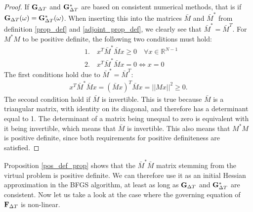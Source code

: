 \begin{proof}
If $\bold G_{\Delta T}$ and $\bold G_{\Delta T}^*$ are based on consistent numerical methods, that is if $\bold G_{\Delta T}(\omega)=\bold G_{\Delta T}^*(\omega)$. When inserting this into the matrices $\bar M$ and $\bar M^*$ from definition \ref{prop_def} and \ref{adjoint_prop_def}, we clearly see that $\bar M^*=\bar M^T$. For $M^*M$ to be positive definite, the following two conditions must hold:
\begin{align*}
&1.\quad x^T\bar M^*\bar Mx \geq 0 \quad \forall x\in\mathbb{R}^{N-1} \\
&2.\quad x^T\bar M^*\bar Mx =0 \iff x=0
\end{align*}
The first conditions hold due to $\bar M^*=\bar M^T$:
\begin{align*}
x^T\bar M^*\bar Mx = (\bar Mx)^T\bar Mx = ||Mx||^2 \geq 0.
\end{align*}
The second condition hold if $\bar M$ is invertible. This is true because $\bar M$ is a triangular matrix, with identity on its diagonal, and therefore has a determinant equal to 1. The determinant of a matrix being unequal to zero is equivalent with it being invertible, which means that $\bar M$ is invertible. This also means that $M^*M$ is positive definite, since both requirements for positive definiteness are satisfied. 
\end{proof}
\noindent
Proposition \ref{pos_def_prop} shows that the $\bar M^*\bar M$ matrix stemming from the virtual problem is positive definite. We can therefore use it as an initial Hessian approximation in the BFGS algorithm, at least as long as $\bold G_ {\Delta T}$ and $\bold G_ {\Delta T}^*$ are consistent. Now let us take a look at the case where the governing equation of $\bold F_{\Delta T}$ is non-linear.
